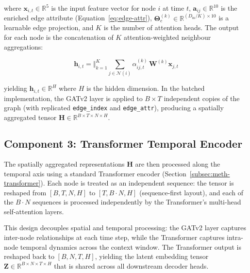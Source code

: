 \noindent where $\mathbf{x}_{i,t} \in \mathbb{R}^5$ is the input feature vector for node $i$ at time $t$, $\mathbf{a}_{ij} \in \mathbb{R}^{10}$ is the enriched edge attribute (Equation~\ref{eq:edge-attr}), $\boldsymbol{\Theta}_e^{(k)} \in \mathbb{R}^{(D_{\text{in}}/K) \times 10}$ is a learnable edge projection, and $K$ is the number of attention heads. The output for each node is the concatenation of $K$ attention-weighted neighbour aggregations:

\begin{equation}
    \mathbf{h}_{i,t} = \Big\Vert_{k=1}^{K} \sum_{j \in \mathcal{N}(i)} \alpha^{(k)}_{ij,t}\, \mathbf{W}^{(k)} \mathbf{x}_{j,t}
    \label{eq:spatial-output}
\end{equation}

\noindent yielding $\mathbf{h}_{i,t} \in \mathbb{R}^{H}$ where $H$ is the hidden dimension. In the batched implementation, the GATv2 layer is applied to $B \times T$ independent copies of the graph (with replicated \texttt{edge\_index} and \texttt{edge\_attr}), producing a spatially aggregated tensor $\mathbf{H} \in \mathbb{R}^{B \times T \times N \times H}$.

\subsection{Component 3: Transformer Temporal Encoder}
\label{subsec:meth-temporal-encoder}

The spatially aggregated representations $\mathbf{H}$ are then processed along the temporal axis using a standard Transformer encoder (Section~\ref{subsec:meth-transformer}). Each node is treated as an independent sequence: the tensor is reshaped from $[B, T, N, H]$ to $[T, B \cdot N, H]$ (sequence-first layout), and each of the $B \cdot N$ sequences is processed independently by the Transformer's multi-head self-attention layers.

This design decouples spatial and temporal processing: the GATv2 layer captures inter-node relationships at each time step, while the Transformer captures intra-node temporal dynamics across the context window. The Transformer output is reshaped back to $[B, N, T, H]$, yielding the latent embedding tensor $\mathbf{Z} \in \mathbb{R}^{B \times N \times T \times H}$ that is shared across all downstream decoder heads.

